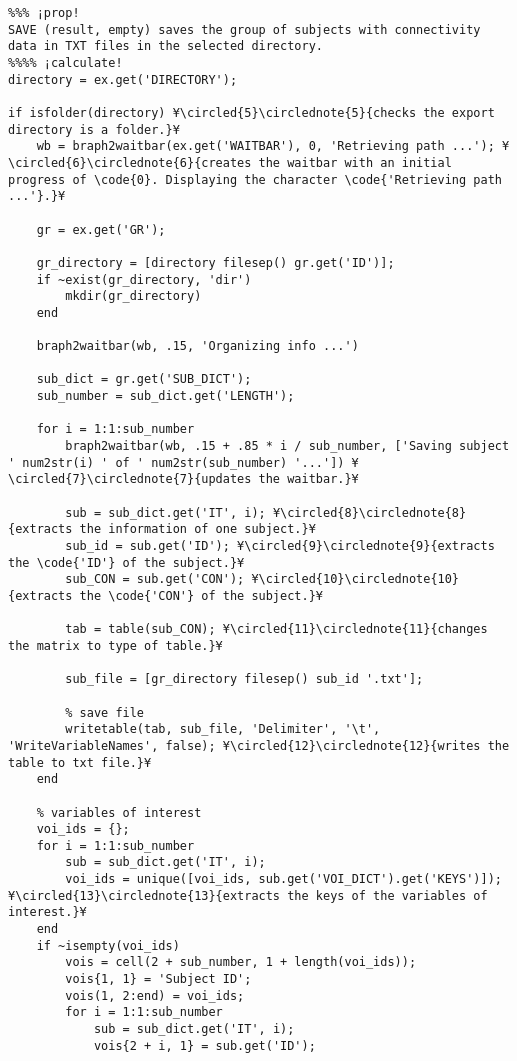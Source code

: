 \documentclass{tufte-handout}
\begin{document}
\begin{lstlisting}
%%% ¡prop!
SAVE (result, empty) saves the group of subjects with connectivity data in TXT files in the selected directory.
%%%% ¡calculate!
directory = ex.get('DIRECTORY');

if isfolder(directory) ¥\circled{5}\circlednote{5}{checks the export directory is a folder.}¥
    wb = braph2waitbar(ex.get('WAITBAR'), 0, 'Retrieving path ...'); ¥\circled{6}\circlednote{6}{creates the waitbar with an initial progress of \code{0}. Displaying the character \code{'Retrieving path ...'}.}¥
    
    gr = ex.get('GR');

    gr_directory = [directory filesep() gr.get('ID')];
    if ~exist(gr_directory, 'dir')
        mkdir(gr_directory)
    end
    
    braph2waitbar(wb, .15, 'Organizing info ...')
    
    sub_dict = gr.get('SUB_DICT');
    sub_number = sub_dict.get('LENGTH');
    
    for i = 1:1:sub_number
        braph2waitbar(wb, .15 + .85 * i / sub_number, ['Saving subject ' num2str(i) ' of ' num2str(sub_number) '...']) ¥\circled{7}\circlednote{7}{updates the waitbar.}¥
        
        sub = sub_dict.get('IT', i); ¥\circled{8}\circlednote{8}{extracts the information of one subject.}¥
        sub_id = sub.get('ID'); ¥\circled{9}\circlednote{9}{extracts the \code{'ID'} of the subject.}¥
        sub_CON = sub.get('CON'); ¥\circled{10}\circlednote{10}{extracts the \code{'CON'} of the subject.}¥

        tab = table(sub_CON); ¥\circled{11}\circlednote{11}{changes the matrix to type of table.}¥

        sub_file = [gr_directory filesep() sub_id '.txt'];

        % save file
        writetable(tab, sub_file, 'Delimiter', '\t', 'WriteVariableNames', false); ¥\circled{12}\circlednote{12}{writes the table to txt file.}¥
    end
    
    % variables of interest
    voi_ids = {};
    for i = 1:1:sub_number
        sub = sub_dict.get('IT', i);
        voi_ids = unique([voi_ids, sub.get('VOI_DICT').get('KEYS')]); ¥\circled{13}\circlednote{13}{extracts the keys of the variables of interest.}¥
    end
    if ~isempty(voi_ids)
        vois = cell(2 + sub_number, 1 + length(voi_ids));
        vois{1, 1} = 'Subject ID';
        vois(1, 2:end) = voi_ids;
        for i = 1:1:sub_number
            sub = sub_dict.get('IT', i);
            vois{2 + i, 1} = sub.get('ID');
            

\end{lstlisting}
\end{document}
